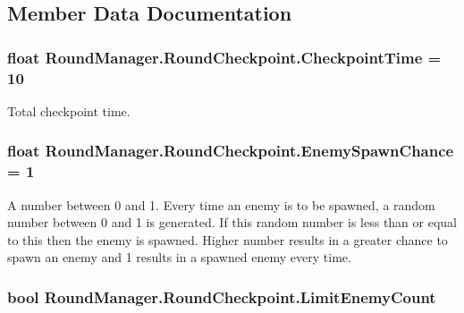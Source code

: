 \subsection{Member Data Documentation}
\hypertarget{class_round_manager_1_1_round_checkpoint_ada4e5eb5397f8a0de95c80d0a5c6c74b}{}
\subsubsection[{Checkpoint\+Time}]{\setlength{\rightskip}{0pt plus 5cm}float Round\+Manager.\+Round\+Checkpoint.\+Checkpoint\+Time = 10}\label{class_round_manager_1_1_round_checkpoint_ada4e5eb5397f8a0de95c80d0a5c6c74b}


Total checkpoint time. 

\hypertarget{class_round_manager_1_1_round_checkpoint_aba7ecc26b04bdae77b97cf832a0c124a}{}
\subsubsection[{Enemy\+Spawn\+Chance}]{\setlength{\rightskip}{0pt plus 5cm}float Round\+Manager.\+Round\+Checkpoint.\+Enemy\+Spawn\+Chance = 1}\label{class_round_manager_1_1_round_checkpoint_aba7ecc26b04bdae77b97cf832a0c124a}


A number between 0 and 1. Every time an enemy is to be spawned, a random number between 0 and 1 is generated. If this random number is less than or equal to this then the enemy is spawned. Higher number results in a greater chance to spawn an enemy and 1 results in a spawned enemy every time. 

\hypertarget{class_round_manager_1_1_round_checkpoint_a74d49222fa14c7c369334853014f337b}{}
\subsubsection[{Limit\+Enemy\+Count}]{\setlength{\rightskip}{0pt plus 5cm}bool Round\+Manager.\+Round\+Checkpoint.\+Limit\+Enemy\+Count}\label{class_round_manager_1_1_round_checkpoint_a74d49222fa14c7c369334853014f337b}



